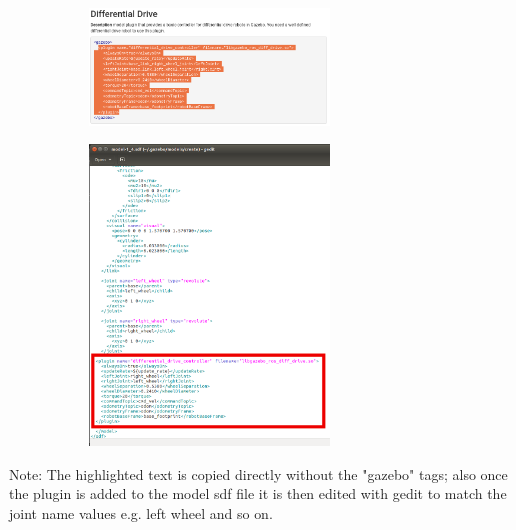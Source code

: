 \documentclass[a4paper, 10pt]{IEEEconf}
\begin{document}
\begin{figure}[H]
\begin{subfigure}{\textwidth}
	\begin{center}
  	\includegraphics[width=0.7\textwidth]{images/Plugin}
  	\label{fig:Using plugins provided from ROS}
  	\end{center}
\end{subfigure}
\begin{subfigure}{\textwidth}
	\begin{center}
  	\includegraphics[width=0.7\textwidth]{images/Plugin2}
  	\label{fig:Applying the plugin}
  	\end{center}
\end{subfigure}
\end{figure}

Note: The highlighted text is copied directly without the "gazebo" tags; also once the plugin is added to the model sdf file it is then edited with gedit to match the joint name values e.g. left wheel and so on.
\end{document}
